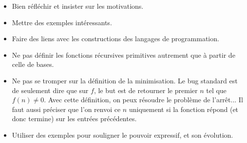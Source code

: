\documentclass{agregfiche}
\begin{document}
\begin{itemize}
    \item Bien réfléchir et insister sur les motivations.
	\item Mettre des exemples intéressants.
    \item Faire des liens avec les constructions des langages de programmation.
	\item Ne pas définir les fonctions récursives primitives autrement que à partir de celle de bases.
    \item Ne pas se tromper sur la définition de la minimisation. Le bug standard est de seulement dire que sur $f$, le but est de retourner le premier $n$ tel que $f(n) \neq 0$. Avec cette définition, on peux résoudre le problème de l'arrêt... Il faut aussi préciser que l'on renvoi ce $n$ uniquement si la fonction répond (et donc termine) sur les entrées précédentes.
    \item Utiliser des exemples pour souligner le pouvoir expressif, et son évolution.
\end{itemize}

\secquestionsclassiques
\end{document}

